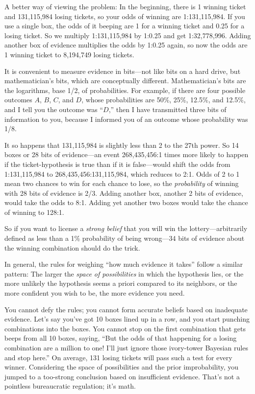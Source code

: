 {
 A better way of viewing the problem: In the beginning, there is 1
winning ticket and 131,115,984 losing tickets, so your odds of winning
are 1:131,115,984. If you use a single box, the odds of it beeping are
1 for a winning ticket and 0.25 for a losing ticket. So we multiply
1:131,115,984 by 1:0.25 and get 1:32,778,996. Adding another box of
evidence multiplies the odds by 1:0.25 again, so now the odds are 1
winning ticket to 8,194,749 losing tickets.}

{
 It is convenient to measure evidence in bits---not like bits on a
hard drive, but mathematician's bits, which are
conceptually different. Mathematician's bits are the
logarithms, base 1/2, of probabilities. For example, if there are four
possible outcomes $A$, $B$, $C$, and $D$, whose probabilities are 50\%, 25\%,
12.5\%, and 12.5\%, and I tell you the outcome was
``$D$,'' then I have transmitted three
bits of information to you, because I informed you of an outcome whose
probability was 1/8.}

{
 It so happens that 131,115,984 is slightly less than 2 to the 27th
power. So 14 boxes or 28 bits of evidence---an event 268,435,456:1
times more likely to happen if the ticket-hypothesis is true than if it
is false---would shift the odds from 1:131,115,984 to
268,435,456:131,115,984, which reduces to 2:1. Odds of 2 to 1 mean two
chances to win for each chance to lose, so the \textit{probability} of
winning with 28 bits of evidence is 2/3. Adding another box, another 2
bits of evidence, would take the odds to 8:1. Adding yet another two
boxes would take the chance of winning to 128:1.}

{
 So if you want to license a \textit{strong belief} that you will
win the lottery---arbitrarily defined as less than a 1\% probability of
being wrong---34 bits of evidence about the winning combination should
do the trick.}

{
 In general, the rules for weighing ``how much
evidence it takes'' follow a similar pattern: The
larger the \textit{space of possibilities} in which the hypothesis
lies, or the more unlikely the hypothesis seems a priori compared to
its neighbors, or the more confident you wish to be, the more evidence
you need.}

{
 You cannot defy the rules; you cannot form accurate beliefs based
on inadequate evidence. Let's say
you've got 10 boxes lined up in a row, and you start
punching combinations into the boxes. You cannot stop on the first
combination that gets beeps from all 10 boxes, saying,
``But the odds of that happening for a losing
combination are a million to one! I'll just ignore
those ivory-tower Bayesian rules and stop here.'' On
average, 131 losing tickets will pass such a test for every winner.
Considering the space of possibilities and the prior improbability, you
jumped to a too-strong conclusion based on insufficient evidence.
That's not a pointless bureaucratic regulation;
it's math.}


